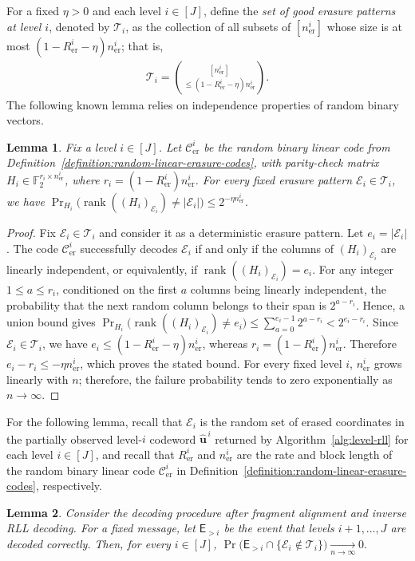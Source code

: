 \documentclass[journal,letterpaper,onecolumn,11pt]{IEEEtran}
\newcommand{\cC}{\mathcal{C}}
\newcommand{\cE}{\mathcal{E}}
\newcommand{\cT}{\mathcal{T}}
\newcommand{\boldu}{\mathbf{u}}
\newcommand{\rank}{\operatorname{rank}}
\newtheorem{lemma}{Lemma}
\begin{document}
For a fixed $\eta>0$ and each level $i\in[J]$, define the
\textit{set of good erasure patterns at level $i$}, denoted by $\cT_i$,
as the collection of all subsets of $[n_{\mathrm{er}}^i]$ whose size
is at most $(1-R_{\mathrm{er}}^i-\eta)n_{\mathrm{er}}^i$; that is,
\begin{align}\label{equation: definition of mathcal T}
     \cT_i
     = \binom{[n_{\mathrm{er}}^i]}
     {\leq (1-R_{\mathrm{er}}^i-\eta)n_{\mathrm{er}}^i}.
\end{align}
The following known lemma relies on independence properties of random binary vectors.
\begin{lemma}\label{lemma:random linear code random erasures}
Fix a level $i\in[J]$. Let $\cC_{\mathrm{er}}^i$ be the random binary
linear code from Definition~\ref{definition:random-linear-erasure-codes},
with parity-check matrix
$H_i\in\mathbb{F}_2^{r_i\times n_{\mathrm{er}}^i}$, where
$r_i=(1-R_{\mathrm{er}}^i)n_{\mathrm{er}}^i$.
For every fixed erasure pattern $\cE_i\in\cT_i$, we have
$
\Pr_{H_i}\bigl(\rank((H_i)_{\cE_i})\neq|\cE_i|\bigr)
\leq 2^{-\eta n_{\mathrm{er}}^i}.
$
\end{lemma}
\begin{proof}
Fix $\cE_i\in\cT_i$ and consider it as a deterministic erasure pattern.
Let $e_i=|\cE_i|$. The code $\cC_{\mathrm{er}}^i$ successfully decodes
$\cE_i$ if and only if the columns of $(H_i)_{\cE_i}$ are linearly
independent, or equivalently, if $\rank((H_i)_{\cE_i})=e_i$.
For any integer~$1\le a\le r_i$, conditioned on the first $a$ columns being linearly independent, 
the probability that the next random column belongs to their span is $2^{a-r_i}$.
Hence, a union bound gives
$
\Pr_{H_i}\bigl(\rank((H_i)_{\cE_i})\neq e_i\bigr)
\leq \sum_{a=0}^{e_i-1}2^{a-r_i}<2^{e_i-r_i}.
$
Since $\cE_i\in\cT_i$, we have
$e_i\leq(1-R_{\mathrm{er}}^i-\eta)n_{\mathrm{er}}^i$, whereas
$r_i=(1-R_{\mathrm{er}}^i)n_{\mathrm{er}}^i$. Therefore
$e_i-r_i\leq-\eta n_{\mathrm{er}}^i$, which proves the stated bound.
For every fixed level $i$, $n_{\mathrm{er}}^i$ grows linearly with $n$;
therefore, the failure probability tends to zero exponentially as
$n\to\infty$.
\end{proof}
For the following lemma, recall that $\cE_i$ is the
random set of erased coordinates in the partially observed level-$i$
codeword $\widehat{\boldu}^{\,i}$ returned by
Algorithm~\ref{alg:level-rll} for each level $i\in[J]$, and
recall that $R_{\mathrm{er}}^i$ and
$n_{\mathrm{er}}^i$ are the rate and block length of the
random binary linear code $\cC_{\mathrm{er}}^i$ in
Definition~\ref{definition:random-linear-erasure-codes}, respectively. 
\begin{lemma}\label{lemma:bound on number of erasures}
Consider the decoding procedure after fragment alignment and
inverse RLL decoding. 
For a fixed
message, let $\mathsf E_{>i}$ be the event that levels
$i+1,\ldots,J$ are decoded correctly.
Then, for every $i\in[J]$,
$
\Pr\bigl(\mathsf E_{>i}\cap\{\cE_i\notin\cT_i\}\bigr)
\xrightarrow[n\to\infty]{}0.
$
\end{lemma}
\end{document}
